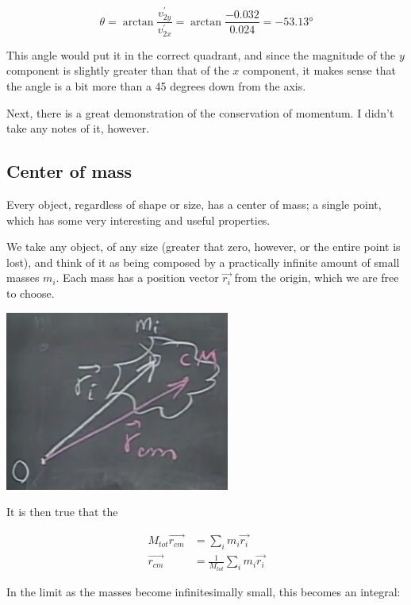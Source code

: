 \documentclass[12pt,a4paper]{report}
\begin{document}
\begin{equation}
\theta = \arctan \frac{v_{2y}^{'}}{v_{2x}^{'}} = \arctan \frac{-0.032}{0.024} = \ang{-53.13}
\end{equation}

This angle would put it in the correct quadrant, and since the magnitude of the $y$ component is slightly greater than that of the $x$ component, it makes sense that the angle is a bit more than a 45 degrees down from the axis.

Next, there is a great demonstration of the conservation of momentum. I didn't take any notes of it, however.

\subsection{Center of mass}

Every object, regardless of shape or size, has a center of mass; a single point, which has some very interesting and useful properties.

We take any object, of any size (greater that zero, however, or the entire point is lost), and think of it as being composed by a practically infinite amount of small masses $m_i$. Each mass has a position vector $\vec{r_i}$ from the origin, which we are free to choose.

\begin{center}
\includegraphics[scale=0.7]{Graphics/lec15_cm}
\end{center}

It is then true that the 

\begin{align}
M_{tot} \vec{r_{cm}} &= \sum_i m_i \vec{r_i}\\
\vec{r_{cm}} &= \frac{1}{M_{tot}} \sum_i m_i \vec{r_i}
\end{align}

In the limit as the masses become infinitesimally small, this becomes an integral:
\end{document}
